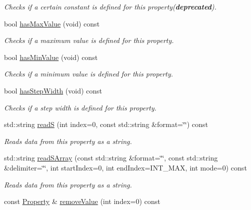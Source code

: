 \begin{DoxyCompactItemize}
\begin{DoxyCompactList}\small\item\em Checks if a certain constant is defined for this property({\bfseries deprecated}). \end{DoxyCompactList}\item 
bool \hyperlink{classmv_i_m_p_a_c_t_1_1acquire_1_1_property_a8fbc59e51ec6bf739d054078a5aa3021}{has\+Max\+Value} (void) const 
\begin{DoxyCompactList}\small\item\em Checks if a maximum value is defined for this property. \end{DoxyCompactList}\item 
bool \hyperlink{classmv_i_m_p_a_c_t_1_1acquire_1_1_property_ab94e2773892274787f6745a133493ebb}{has\+Min\+Value} (void) const 
\begin{DoxyCompactList}\small\item\em Checks if a minimum value is defined for this property. \end{DoxyCompactList}\item 
bool \hyperlink{classmv_i_m_p_a_c_t_1_1acquire_1_1_property_a8b42a3292260a81fc6b72c85934d5564}{has\+Step\+Width} (void) const 
\begin{DoxyCompactList}\small\item\em Checks if a step width is defined for this property. \end{DoxyCompactList}\item 
std\+::string \hyperlink{classmv_i_m_p_a_c_t_1_1acquire_1_1_property_aa5fe87d8c899f71c88a7cacb4da2fb43}{read\+S} (int index=0, const std\+::string \&format=\char`\"{}\char`\"{}) const 
\begin{DoxyCompactList}\small\item\em Reads data from this property as a string. \end{DoxyCompactList}\item 
std\+::string \hyperlink{classmv_i_m_p_a_c_t_1_1acquire_1_1_property_aeba0bb5fdb980e349c412b6e34798428}{read\+S\+Array} (const std\+::string \&format=\char`\"{}\char`\"{}, const std\+::string \&delimiter=\char`\"{}\char`\"{}, int start\+Index=0, int end\+Index=I\+N\+T\+\_\+\+M\+A\+X, int mode=0) const 
\begin{DoxyCompactList}\small\item\em Reads data from this property as a string. \end{DoxyCompactList}\item 
const \hyperlink{classmv_i_m_p_a_c_t_1_1acquire_1_1_property}{Property} \& \hyperlink{classmv_i_m_p_a_c_t_1_1acquire_1_1_property_a4633aaa98af921d39e645bf5738b5a97}{remove\+Value} (int index=0) const 

\end{DoxyCompactItemize}
